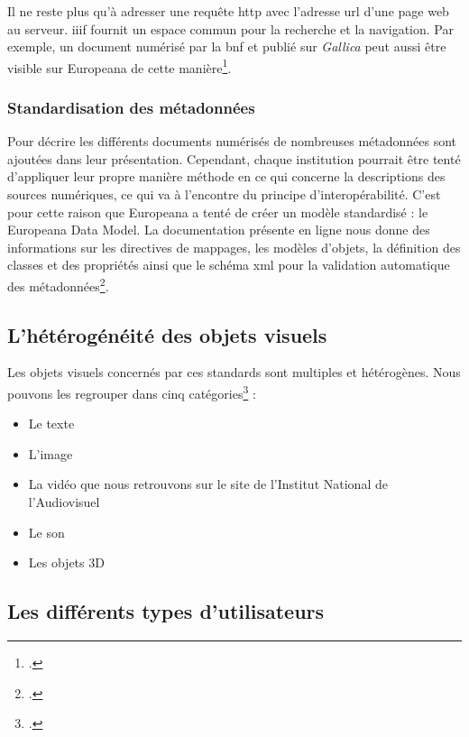 Il ne reste plus qu'à adresser une requête \gls{http} avec l'adresse \gls{url} d'une page web au serveur. \gls{iiif} fournit un espace commun pour la recherche et la navigation. Par exemple, un document numérisé par la \gls{bnf} et publié sur \textit{Gallica} peut aussi être visible sur Europeana de cette manière\footcite{charpierAtelierInitiationIIIF2024}.

\subsubsection{Standardisation des métadonnées}

Pour décrire les différents documents numérisés de nombreuses métadonnées sont ajoutées dans leur présentation. Cependant, chaque institution pourrait être tenté d'appliquer leur propre manière méthode en ce qui concerne la descriptions des sources numériques, ce qui va à l'encontre du principe d'interopérabilité. C'est pour cette raison que Europeana a tenté de créer un modèle standardisé : le Europeana Data Model. La documentation présente en ligne nous donne des informations sur les directives de mappages, les modèles d'objets, la définition des classes et des propriétés ainsi que le schéma \gls{xml} pour la validation automatique des métadonnées\footcite{EuropeanaDataModel}. 

\subsection{L'hétérogénéité des objets visuels}

Les objets visuels concernés par ces standards sont multiples et hétérogènes. Nous pouvons les regrouper dans cinq catégories\footcite{windhagerReviewInformationVisualization} : 

\begin{itemize}
	\item Le texte
	\item L'image
	\item La vidéo que nous retrouvons sur le site de l'Institut National de l'Audiovisuel 
	\item Le son
	\item Les objets 3D
\end{itemize}

\subsection{Les différents types d'utilisateurs}

